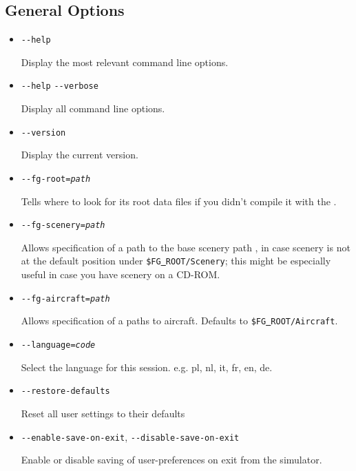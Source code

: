 \subsection{General Options}\label{generaloptions}
\begin{itemize}
\item{\texttt{-$ $-help}}

  Display the most relevant command line options.

\item{\texttt{-$ $-help} \texttt{-$ $-verbose}}

  Display all command line options.

\item{\texttt{-$ $-version} }

Display the current \FlightGear{} version.

\item{\texttt{-$ $-fg-root={\it path}}}

  Tells \FlightGear{} where to look for its root data files if you
  didn't compile it with the .

\item{\texttt{-$ $-fg-scenery={\it path}}}

  Allows specification of a path to the base scenery path
  , in case scenery is not at the default
  position under \texttt{\$FG\underline{~}ROOT/Scenery}; this might
  be especially useful in case you have scenery on a CD-ROM.

\item{\texttt{-$ $-fg-aircraft={\it path}}}

  Allows specification of a paths to aircraft. Defaults to
  \texttt{\$FG\underline{~}ROOT/Aircraft}.

\item{\texttt{-$ $-language={\it code}}}

  Select the language for this session. e.g. pl, nl, it, fr, en, de.

\item{\texttt{-$ $-restore-defaults}}

  Reset all user settings to their defaults

\item{\texttt{-$ $-enable-save-on-exit}, \texttt{-$ $-disable-save-on-exit}}

  Enable or disable saving of user-preferences on exit from the simulator.


\end{itemize}
